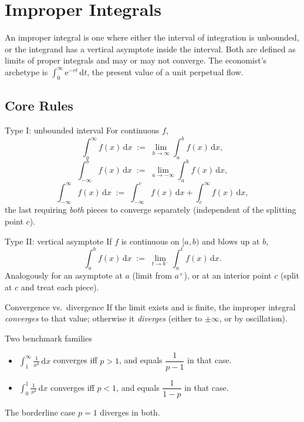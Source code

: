 \chapter{Improper Integrals}

An improper integral is one where either
the interval of integration is unbounded, or the integrand has a
vertical asymptote inside the interval. Both are defined as limits of
proper integrals and may or may not converge. The economist's archetype
is $\int_{0}^{\infty} \mathrm{e}^{-rt}\,\mathrm{d}t$, the present value
of a unit perpetual flow.

\section{Core Rules}

\begin{rulebox}{Type I: unbounded interval}
For continuous $f$,
\[
  \int_{a}^{\infty} f(x)\,\mathrm{d}x \;:=\; \lim_{b\to\infty}\int_{a}^{b} f(x)\,\mathrm{d}x,
\]
\[
  \int_{-\infty}^{b} f(x)\,\mathrm{d}x \;:=\; \lim_{a\to-\infty}\int_{a}^{b} f(x)\,\mathrm{d}x,
\]
\[
  \int_{-\infty}^{\infty} f(x)\,\mathrm{d}x \;:=\; \int_{-\infty}^{c} f(x)\,\mathrm{d}x+\int_{c}^{\infty} f(x)\,\mathrm{d}x,
\]
the last requiring \emph{both} pieces to converge separately
(independent of the splitting point $c$).
\end{rulebox}

\begin{rulebox}{Type II: vertical asymptote}
If $f$ is continuous on $[a,b)$ and blows up at $b$,
\[
  \int_{a}^{b} f(x)\,\mathrm{d}x \;:=\; \lim_{t\to b^{-}}\int_{a}^{t} f(x)\,\mathrm{d}x .
\]
Analogously for an asymptote at $a$ (limit from $a^{+}$), or at an
interior point $c$ (split at $c$ and treat each piece).
\end{rulebox}

\begin{rulebox}{Convergence vs.\ divergence}
If the limit exists and is finite, the improper integral
\emph{converges} to that value; otherwise it \emph{diverges} (either to
$\pm\infty$, or by oscillation).
\end{rulebox}

\begin{rulebox}{Two benchmark families}
\begin{itemize}[leftmargin=1.6em,itemsep=0.3ex]
  \item $\displaystyle\int_{1}^{\infty} \frac{1}{x^{p}}\,\mathrm{d}x$
        converges iff $p>1$, and equals $\dfrac{1}{p-1}$ in that case.
  \item $\displaystyle\int_{0}^{1} \frac{1}{x^{p}}\,\mathrm{d}x$
        converges iff $p<1$, and equals $\dfrac{1}{1-p}$ in that case.
\end{itemize}
The borderline case $p=1$ diverges in both.
\end{rulebox}

